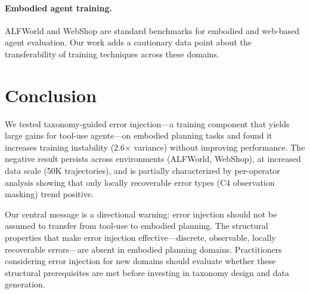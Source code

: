 \documentclass[11pt,a4paper]{article}
\begin{document}
\paragraph{Embodied agent training.} ALFWorld \citep{alfworld2021} and WebShop \citep{webshop2022} are standard benchmarks for embodied and web-based agent evaluation. Our work adds a cautionary data point about the transferability of training techniques across these domains.

\section{Conclusion}
\label{sec:conclusion}

We tested taxonomy-guided error injection---a training component that yields large gains for tool-use agents---on embodied planning tasks and found it increases training instability (2.6$\times$ variance) without improving performance. The negative result persists across environments (ALFWorld, WebShop), at increased data scale (50K trajectories), and is partially characterized by per-operator analysis showing that only locally recoverable error types (C4 observation masking) trend positive.

Our central message is a directional warning: error injection should not be assumed to transfer from tool-use to embodied planning. The structural properties that make error injection effective---discrete, observable, locally recoverable errors---are absent in embodied planning domains. Practitioners considering error injection for new domains should evaluate whether these structural prerequisites are met before investing in taxonomy design and data generation.



\end{document}
